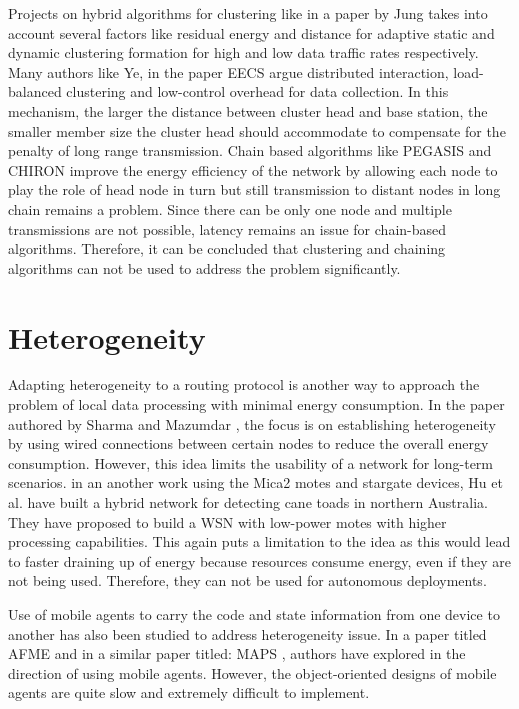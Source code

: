 \par
Projects on hybrid algorithms for clustering like in a paper by Jung \cite{Jung:2009} takes into account several factors like residual energy and distance for adaptive static and dynamic clustering formation for high and low data traffic rates respectively. Many authors like Ye, in the paper EECS \cite{Ye:2005} argue distributed interaction, load-balanced clustering and low-control overhead for data collection. In this mechanism, the larger the distance between cluster head and base station, the smaller member size the cluster head should accommodate to compensate for the penalty of long range transmission. Chain based algorithms like PEGASIS \cite{Lindsey:2002} and CHIRON \cite{Chen:2009} improve the energy efficiency of the network by allowing each node to play the role of head node in turn but still transmission to distant nodes in long chain remains a problem. Since there can be only one node and multiple transmissions are not possible, latency remains an issue for chain-based algorithms. Therefore, it can be concluded that clustering and chaining algorithms can not be used to address the problem significantly.

\section{Heterogeneity}

Adapting heterogeneity to a routing protocol is another way to approach the problem of local data processing with minimal energy consumption. In the paper authored by Sharma and Mazumdar \cite{Sharma:2005}, the focus is on establishing heterogeneity by using wired connections between certain nodes to reduce the overall energy consumption. However, this idea limits the usability of a network for long-term scenarios. in an another work using the Mica2 motes and stargate devices, Hu et al. \cite{hu2009design} have built a hybrid network for detecting cane toads in northern Australia. They have proposed to build a \ac{WSN} with low-power motes with higher processing capabilities. This again puts a limitation to the idea as this would lead to faster draining up of energy because resources consume energy, even if they are not being used. Therefore, they can not be used for autonomous deployments.

Use of mobile agents to carry the code and state information from one device to another has also been studied to address heterogeneity issue. In a paper titled AFME  \cite{muldoon2008agent} and in a similar paper titled: MAPS \cite{Aiello:2011}, authors have explored in the direction of using mobile agents. However, the object-oriented designs of mobile agents are quite slow and extremely difficult to implement.

